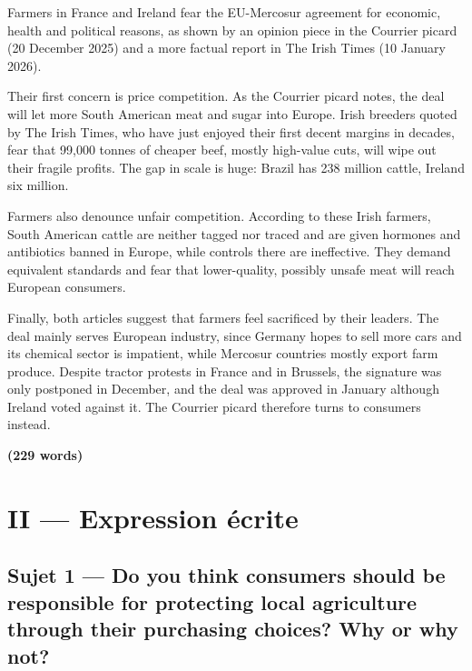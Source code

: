 \documentclass[11pt,a4paper]{article}
\begin{document}
Farmers in France and Ireland fear the EU-Mercosur agreement for economic, health and political reasons, as shown by an opinion piece in the Courrier picard (20 December 2025) and a more factual report in The Irish Times (10 January 2026).

Their first concern is price competition. As the Courrier picard notes, the deal will let more South American meat and sugar into Europe. Irish breeders quoted by The Irish Times, who have just enjoyed their first decent margins in decades, fear that 99,000 tonnes of cheaper beef, mostly high-value cuts, will wipe out their fragile profits. The gap in scale is huge: Brazil has 238 million cattle, Ireland six million.

Farmers also denounce unfair competition. According to these Irish farmers, South American cattle are neither tagged nor traced and are given hormones and antibiotics banned in Europe, while controls there are ineffective. They demand equivalent standards and fear that lower-quality, possibly unsafe meat will reach European consumers.

Finally, both articles suggest that farmers feel sacrificed by their leaders. The deal mainly serves European industry, since Germany hopes to sell more cars and its chemical sector is impatient, while Mercosur countries mostly export farm produce. Despite tractor protests in France and in Brussels, the signature was only postponed in December, and the deal was approved in January although Ireland voted against it. The Courrier picard therefore turns to consumers instead.

\textbf{(229 words)}

\hypertarget{ii-expression-uxe9crite}{%
\section{II --- Expression écrite}\label{ii-expression-uxe9crite}}

\hypertarget{sujet-1-do-you-think-consumers-should-be-responsible-for-protecting-local-agriculture-through-their-purchasing-choices-why-or-why-not}{%
\subsection{Sujet 1 --- Do you think consumers should be responsible for protecting local agriculture through their purchasing choices? Why or why not?}\label{sujet-1-do-you-think-consumers-should-be-responsible-for-protecting-local-agriculture-through-their-purchasing-choices-why-or-why-not}}
\end{document}
